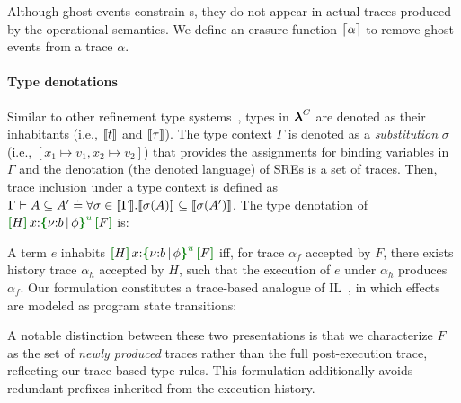 Although ghost events constrain \tyName{}s, they do not
appear in actual traces produced by the operational semantics. We
define an erasure function $\lceil {\alpha} \rceil$ to remove ghost events from a trace $\alpha$.

\paragraph{Type denotations} Similar to other refinement type
systems~\cite{JV21}, types in $\boldsymbol{\lambda}^{C}$ are denoted as their inhabitants
(i.e., $\llbracket {t} \rrbracket$ and $\llbracket {\tau} \rrbracket$).  The type context $\Gamma$ is
denoted as a \emph{substitution} $\sigma$ (i.e.,
$[x_1\mapsto v_1, x_2\mapsto v_2]$) that provides the assignments for
binding variables in $\Gamma$ and the denotation (the denoted
language) of SREs is a set of traces. Then, trace inclusion under a
type context is defined as
$\Gamma \vdash A \subseteq A' \doteq \forall \sigma \in
\llbracket {\Gamma} \rrbracket. \llbracket {\sigma(A)} \rrbracket \subseteq \llbracket {\sigma(A')} \rrbracket$.  The
type denotation of $\uhat{H}{x{:}\urt{b}{\phi}}{F}$ is:
\vspace{-.4cm} \par{}\noindent
A term $e$ inhabits $\uhat{H}{x{:}\urt{b}{\phi}}{F}$ iff, for trace $\alpha_f$ accepted by $F$, there exists history trace $\alpha_h$ accepted by $H$, such that the execution of $e$ under
$\alpha_h$ produces $\alpha_f$.
Our formulation constitutes a trace-based analogue of IL~\cite{OHP19}, in which effects are modeled as program state transitions:
\vspace{-.4cm} \par{}\noindent
A notable distinction between these two presentations is that we
characterize $F$ as the set of \emph{newly produced} traces rather
than the full post-execution trace, reflecting our trace-based
type rules. This formulation additionally avoids
redundant prefixes inherited from the execution history.

